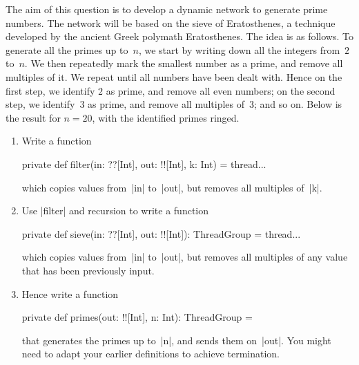 \begin{question}
The aim of this question is to develop a dynamic network to
generate prime numbers.  The network will be based on the sieve of
Eratosthenes, a technique developed by the ancient Greek polymath
Eratosthenes.  The idea is as follows.  To generate all the primes up to~$n$,
we start by writing down all the integers from~$2$ to~$n$.  We then repeatedly
mark the smallest number as a prime, and remove all multiples of it.  We
repeat until all numbers have been dealt with.  Hence on the
first step, we identify $2$ as prime, and remove all even numbers; on the second
step, we identify~$3$ as prime, and remove all multiples of~$3$; and so on.
Below is the result for $n = 20$, with the identified primes ringed.
%
\begin{center}\small
{}
\end{center}

\begin{enumerate}
\item Write a function
\begin{scala}
  private def filter(in: ??[Int], out: !![Int], k: Int) = thread{...}
\end{scala}
which copies values from~|in| to~|out|, but removes all multiples of~|k|.

\item Use |filter| and recursion to write a function
\begin{scala}
  private def sieve(in: ??[Int], out: !![Int]): ThreadGroup = thread{...}
\end{scala}
which copies values from~|in| to~|out|, but removes all multiples of any value
that has been previously input.  

\item Hence write a function
\begin{scala}
  private def primes(out: !![Int], n: Int): ThreadGroup =
\end{scala}
that generates the primes up to~|n|, and sends them on~|out|.  You might need
to adapt your earlier definitions to achieve termination. 
\end{enumerate}
\end{question}

